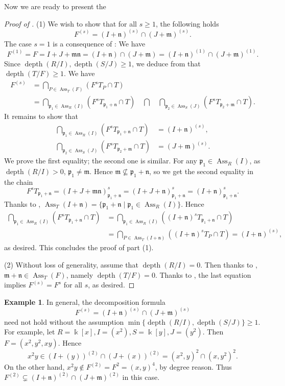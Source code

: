 \documentclass{amsart}
\DeclareMathOperator{\Ass}{Ass}
\DeclareMathOperator{\depth}{depth}
\newcommand{\mm}{\mathfrak{m}}
\newcommand{\nn}{\mathfrak{n}}
\newcommand{\pp}{\mathfrak{p}}
\theoremstyle{plain}
\theoremstyle{definition}
\newtheorem{ex}[thm]{Example}
\numberwithin{equation}{section}
\newcommand{\kk}{\Bbbk}
\begin{document}
Now we are ready to present the
\begin{proof}[Proof of ]
(1) We wish to show that for all $s\ge 1$, the following holds
$$
F^{(s)}=(I+\nn)^{(s)}\cap(J+\mm)^{(s)}.
$$
The case $s=1$ is a consequence of : We have
\[
F^{(1)}=F=I+J+\mm \nn=(I+\nn) \cap (J+\mm) = (I+\nn)^{(1)}\cap(J+\mm)^{(1)}.
\]
Since $\depth(R/I), \depth(S/J)\ge 1$, we deduce from  that $\depth(T/F)\ge 1$. We have
\begin{align*}
F^{(s)} &=\bigcap_{P\in \Ass_T(F)} (F^sT_P \cap T)\\
        &= \bigcap_{\pp_1\in \Ass_R(I)} (F^sT_{\pp_1+\nn} \cap T) \quad \bigcap \quad  \bigcap_{\pp_2\in \Ass_S(J)} (F^sT_{\pp_2+\mm} \cap T).
\end{align*}
It remains to show that
\begin{align*}
 \bigcap_{\pp_1\in \Ass_R(I)} (F^sT_{\pp_1+\nn} \cap T) &= (I+\nn)^{(s)},\\
 \bigcap_{\pp_2\in \Ass_S(J)} (F^sT_{\pp_2+\mm} \cap T) &=(J+\mm)^{(s)}.
\end{align*}
We prove the first equality; the second one is similar. For any $\pp_1\in \Ass_R(I)$, as $\depth(R/I)>0$, $\pp_1\neq \mm$. Hence $\mm \not\subseteq \pp_1+\nn$, so we get the second equality in the chain
\[
F^sT_{\pp_1+\nn}=(I+J+\mm \nn)^s_{\pp_1+\nn}=(I+J+\nn)^s_{\pp_1+\nn}=(I+\nn)^s_{\pp_1+\nn}.
\]
Thanks to , $\Ass_T(I+\nn)=\{\pp_1+\nn \mid \pp_1 \in \Ass_R(I)\}$. Hence
\begin{align*}
 \bigcap_{\pp_1\in \Ass_R(I)} (F^sT_{\pp_1+\nn} \cap T) &= \bigcap_{\pp_1\in \Ass_R(I)} ((I+\nn)^sT_{\pp_1+\nn} \cap T) \\
                                                        &=\bigcap_{P\in \Ass_T(I+\nn )} ((I+\nn)^sT_P \cap T) =(I+\nn)^{(s)},
\end{align*}
as desired. This concludes the proof of part (1).

(2) Without loss of generality, assume that $\depth(R/I)=0$. Then thanks to , $\mm+\nn \in \Ass_T(F)$, namely $\depth(T/F)=0$. Thanks to , the last equation implies $F^{(s)}=F^s$ for all $s$, as desired.
\end{proof}
\begin{ex}
In general, the decomposition formula 
$$F^{(s)}=(I+\nn)^{(s)}\cap(J+\mm)^{(s)}
$$ 
need not hold without the assumption $\min \{\depth(R/I),\depth(S/J) \}\ge 1$. For example, let $R=\kk[x], I=(x^2), S=\kk[y], J=(y^2)$. Then $F=(x^2,y^2,xy)$. Hence
\[
x^2y\in (I+(y))^{(2)} \cap (J+(x))^{(2)}=(x^2,y)^2 \cap (x,y^2)^2.
\]
On the other hand, $x^2y\notin F^{(2)}=F^2=(x,y)^4$, by degree reason. Thus $F^{(2)}\subsetneq (I+\nn)^{(2)}\cap(J+\mm)^{(2)}$ in this case.

\end{ex}
\end{document}
